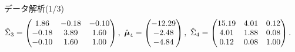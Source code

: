 \documentclass[dvipdfmx]{beamer} %
\newcommand{\bm}[1]{\mbox{\boldmath $#1$}}
\begin{document}
\begin{frame}{データ解析(1/3)}
\begin{equation*}
\begin{split}
&\hat \Sigma_3 = \begin{pmatrix}  1.86  & -0.18 &  -0.10 \\-0.18 & 3.89 & 1.60 \\  -0.10 & 1.60 & 1.00 \\ \end{pmatrix},\ 
\hat{\bm \mu}_4 = \begin{pmatrix} -12.29   \\ -2.48 \\ -4.84 \\ \end{pmatrix},\ 
\hat \Sigma_4 = \begin{pmatrix} 15.19 & 4.01 &  0.12 \\ 4.01 & 1.88 & 0.08 \\ 0.12 & 0.08 &1.00 \\ \end{pmatrix}.
\end{split}
\end{equation*}
\normalsize
\end{frame}
\end{document}
